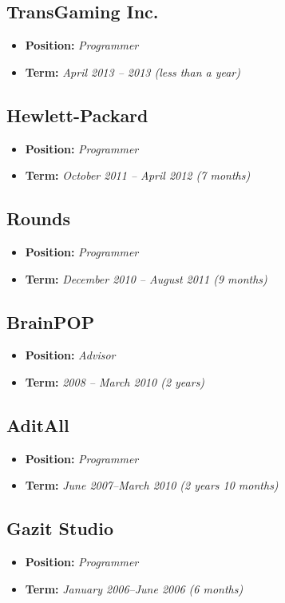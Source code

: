 \documentclass[11pt]{article}
\begin{document}
\subsection{TransGaming Inc.}
\label{sec-2-2}
\begin{itemize}
\item \textbf{Position:} \emph{Programmer}
\item \textbf{Term:} \emph{April 2013 – 2013 (less than a year)}
\end{itemize}
\subsection{Hewlett-Packard}
\label{sec-2-3}
\begin{itemize}
\item \textbf{Position:} \emph{Programmer}
\item \textbf{Term:} \emph{October 2011 – April 2012 (7 months)}
\end{itemize}
\subsection{Rounds}
\label{sec-2-4}
\begin{itemize}
\item \textbf{Position:} \emph{Programmer}
\item \textbf{Term:} \emph{December 2010 – August 2011 (9 months)}
\end{itemize}
\subsection{BrainPOP}
\label{sec-2-5}
\begin{itemize}
\item \textbf{Position:} \emph{Advisor}
\item \textbf{Term:} \emph{2008 – March 2010 (2 years)}
\end{itemize}
\subsection{AditAll}
\label{sec-2-6}
\begin{itemize}
\item \textbf{Position:} \emph{Programmer}
\item \textbf{Term:} \emph{June 2007--March 2010 (2 years 10 months)}
\end{itemize}
\subsection{Gazit Studio}
\label{sec-2-7}
\begin{itemize}
\item \textbf{Position:} \emph{Programmer}
\item \textbf{Term:} \emph{January 2006--June 2006 (6 months)}
\end{itemize}
\end{document}

